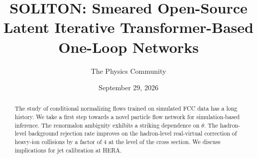 \documentclass[11pt]{article}
\title{SOLITON: Smeared Open-Source Latent Iterative Transformer-Based One-Loop Networks}
\author{The Physics Community}
\date{September 29, 2026}
\numberwithin{equation}{section}
\theoremstyle{definition}
\theoremstyle{remark}
\begin{document}
\maketitle
\begin{abstract}
The study of conditional normalizing flows trained on simulated FCC data
has a long history. We take a first step towards a novel particle flow
network for simulation-based inference. The renormalon ambiguity
exhibits a striking dependence on $\theta$. The hadron-level background
rejection rate improves on the hadron-level real-virtual correction of
heavy-ion collisions by a factor of 4 at the level of the cross section.
We discuss implications for jet calibration at HERA.
\end{abstract}
\tableofcontents





\nocite{*}


\end{document}
